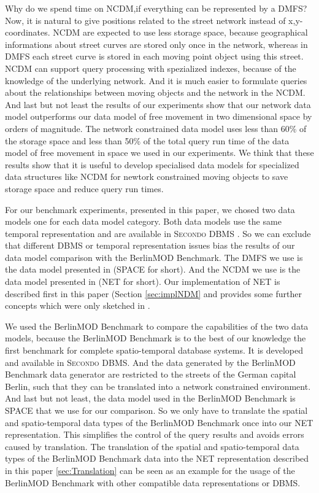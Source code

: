 \documentclass[a4paper]{article}
\newcommand{\secondo}{\textsc{Secondo}}
\newcommand{\bmodb} {BerlinMOD Benchmark}
\begin{document}
Why do we spend time on NCDM,if everything can be represented by
a DMFS? Now, it is natural to give positions related to the street
network instead of x,y-coordinates. NCDM are expected to use less storage space,
because geographical informations about street curves are stored only once in
the network, whereas in DMFS each street curve is stored in each moving point
object using this street. NCDM can support query processing with spezialized indexes,
because of the knowledge of the underlying network. And it is much easier to
formulate queries about the relationships between moving objects and the network
in the NCDM. And last but not least the results of our experiments show that
our network data model outperforms our data model of free movement in two dimensional
space by orders of magnitude. The network constrained data model uses less than
60\% of the storage space and less than 50\% of the total query run time of the
data model of free movement in space we used in our experiments.
We think that these results show that it is useful
to develop specialised data models for specialized data structures like NCDM for
newtork constrained moving objects to save storage space and reduce query run times.

For our benchmark experiments, presented in this paper, we chosed two data models
one for each data model category. Both data models use the same temporal representation
and are available in \secondo{} DBMS
\cite{SecondoEnvironmentDieker,SecondoPlatformPrototypingGueting}.
So we can exclude that different DBMS or temporal
representation issues bias the results of our data model comparison with the
\bmodb{}\cite{BerlinMODVLDBDuentgen}.
The DMFS we use is the data model presented in
\cite{RepresentingMovingObjectsGueting,DataModelDataStructureGueting}
(SPACE for short).
And the NCDM we use is the data model presented in \cite{NetworkGueting} (NET for short).
Our implementation of NET is described first in this paper (Section \ref{sec:implNDM}
and provides some further concepts which were only sketched in \cite{NetworkGueting}.

We used the \bmodb{} \cite{BerlinMODVLDBDuentgen} to compare the capabilities of
the two data models, because the \bmodb{} is to the best of our knowledge the
first benchmark for complete spatio-temporal database systems.
It is developed and available in \secondo{} DBMS. And the data generated by the
\bmodb{} data generator are restricted to the streets of the German capital Berlin,
such that they can be translated into a network constrained environment.
And last but not least, the data model used in the \bmodb{} is SPACE that we use
for our comparison. So we only have to translate the spatial and spatio-temporal
data types of the \bmodb{} once into our NET representation. This simplifies the
control of the query results and avoids errors caused by translation.
The translation of the spatial and spatio-temporal data types of the \bmodb{} data
into the NET representation described in this paper \ref{sec:Translation} can be
seen as an example for the usage of the \bmodb{} with other compatible data
representations or DBMS.
\end{document}
